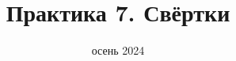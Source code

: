 
\newif\ifhandout




\title[7. Свёртки]{Практика 7. Свёртки}
\date{осень 2024}



    \setcounter{framenumber}{-1}
    \maketitle


